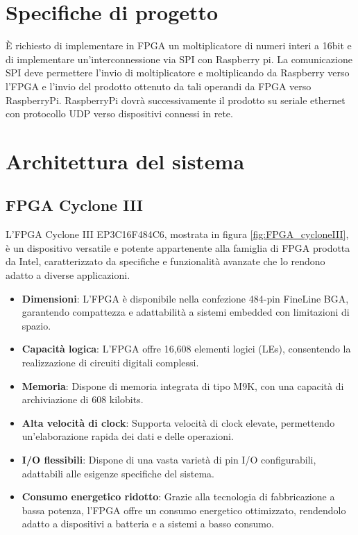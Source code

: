 \documentclass[titlepage]{report}
\begin{document}
  
\setlength{\parskip}{\baselineskip} 


\begin{frontespizio}
\end{frontespizio}
\tableofcontents
\newpage


\chapter*{Specifiche di progetto}
\label{ch:specs}
	È richiesto di implementare in FPGA un moltiplicatore di numeri interi a 16bit e di
	implementare un'interconnessione via SPI con Raspberry pi. La comunicazione SPI deve
	permettere l'invio di moltiplicatore e moltiplicando da Raspberry verso l'FPGA e l'invio del
	prodotto ottenuto da tali operandi da FPGA verso RaspberryPi. 
	RaspberryPi dovrà successivamente il prodotto su seriale ethernet con protocollo UDP verso dispositivi connessi in rete.

\chapter*{Architettura del sistema}
\label{ch:architettura}

	\section*{FPGA Cyclone III}
	\label{sec:fpga}
		L'FPGA Cyclone III EP3C16F484C6, mostrata in figura \ref{fig:FPGA_cycloneIII}, è un dispositivo versatile e potente appartenente alla famiglia di FPGA prodotta da Intel, caratterizzato da specifiche e funzionalità avanzate che lo rendono adatto a diverse applicazioni.

		\begin{itemize}
			\item \textbf{Dimensioni}: L'FPGA è disponibile nella confezione 484-pin FineLine BGA, garantendo compattezza e adattabilità a sistemi embedded con limitazioni di spazio.
			\item \textbf{Capacità logica}: L'FPGA offre 16,608 elementi logici (LEs), consentendo la realizzazione di circuiti digitali complessi.
			\item \textbf{Memoria}: Dispone di memoria integrata di tipo M9K, con una capacità di archiviazione di 608 kilobits.
			\item \textbf{Alta velocità di clock}: Supporta velocità di clock elevate, permettendo un'elaborazione rapida dei dati e delle operazioni.
			\item \textbf{I/O flessibili}: Dispone di una vasta varietà di pin I/O configurabili, adattabili alle esigenze specifiche del sistema.
			\item \textbf{Consumo energetico ridotto}: Grazie alla tecnologia di fabbricazione a bassa potenza, l'FPGA offre un consumo energetico ottimizzato, rendendolo adatto a dispositivi a batteria e a sistemi a basso consumo.
		\end{itemize}
		
\end{document}
